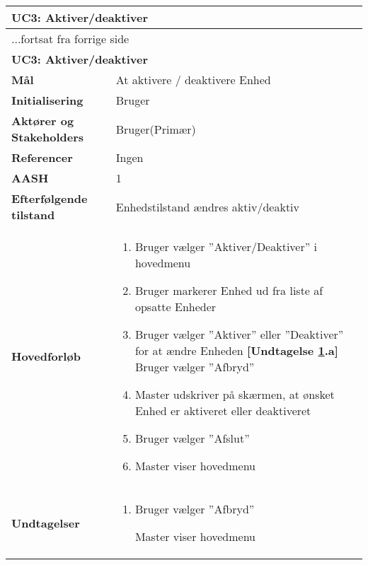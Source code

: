 \begin{center} \centering \label{UC3} 
	\begin{longtable}{|p{5cm}|p{9cm}|}  %
	\hline
		\multicolumn{2}{|l|}{\textbf{UC3: Aktiver/deaktiver}} \\\hline %
		\endfirsthead
		
		\multicolumn{2}{l}{...fortsat fra forrige side} \\ \hline %
		\multicolumn{2}{|l|}{\textbf{UC3: Aktiver/deaktiver}} \\\hline %
		\endhead	
		
		\textbf{Mål}								&At aktivere / deaktivere Enhed	\\\hline
		\textbf{Initialisering}					&Bruger				\\\hline
		\textbf{Aktører og Stakeholders}			&Bruger(Primær)		\\\hline
		\textbf{Referencer}						&Ingen				\\\hline
		\textbf{AASH}							&1					\\\hline
		\textbf{Efterfølgende tilstand}			&Enhedstilstand ændres aktiv/deaktiv\\\hline
		\textbf{Hovedforløb}					
			&\begin{enumerate}
	
	
				\item Bruger vælger ''Aktiver/Deaktiver'' i hovedmenu
				
				\item Bruger markerer Enhed ud fra liste af opsatte Enheder
				
				\item \label{uc3aktiver} Bruger vælger ''Aktiver'' eller ''Deaktiver'' for at ændre Enheden\newline
				\textbf{[Undtagelse \ref{uc3aktiver}.a]} Bruger vælger ''Afbryd''
				
				\item Master udskriver på skærmen, at ønsket Enhed er aktiveret eller deaktiveret		
			
				\item Bruger vælger ''Afslut''
				
				\item Master viser hovedmenu	
	
			\end{enumerate}\\\hline
			
		\textbf{Undtagelser}
			&\begin{enumerate}[label=\ref{uc3aktiver}.a]
				
				\item Bruger vælger ''Afbryd''
				
					\subitem Master viser hovedmenu
			\end{enumerate}\\\hline			
			
	\end{longtable}
\end{center}

